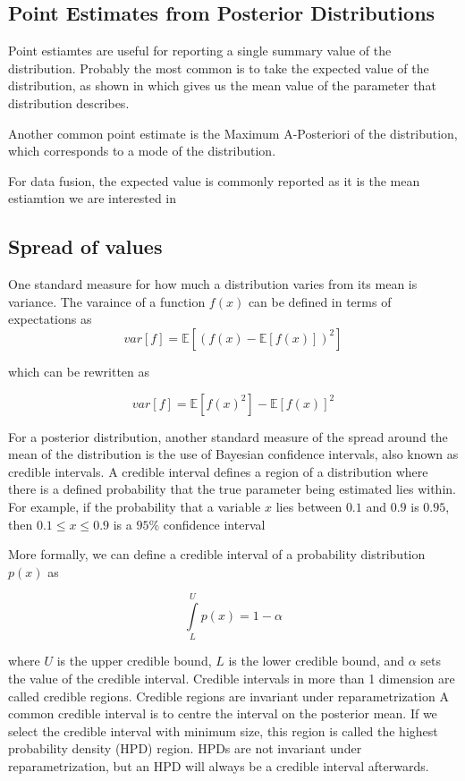 %	

\subsection{Point Estimates from Posterior Distributions}

Point estiamtes are useful for reporting a single summary value of the distribution. 
Probably the most common is to take the expected value of the distribution, as shown in  which gives us the mean value of the parameter that distribution describes. 

Another common point estimate is the Maximum A-Posteriori of the distribution, which corresponds to a mode of the distribution.

For data fusion, the expected value is commonly reported as it is the mean estiamtion we are interested in 


\subsection{Spread of values}
One standard measure for how much a distribution varies from its mean is variance. The varaince of a function $f(x)$ can be defined in terms of expectations as 
\[ 
var[f]=\mathbb{E}[(f(x)-\mathbb{E}[f(x)])^2]
\]

which can be rewritten as

\[ 
var[f]=\mathbb{E}[f(x)^2]-\mathbb{E}[f(x)]^2
\]


For a posterior distribution, another standard measure of the spread around the mean of the distribution is the use of Bayesian confidence intervals, also known as credible intervals. 
A credible interval defines a region of a distribution where there is a defined probability that the true parameter being estimated lies within. 
For example, if the probability that a variable $x$ lies between $0.1$ and $0.9$ is $0.95$, then $0.1 \leq  x \leq 0.9$ is a $95\% $ confidence interval

More formally, we can define a credible interval of a probability distribution $p(x)$ as

\[ 
\int\limits_L^U p(x)=1-\alpha
\]

where $U$ is the upper credible bound, $L$ is the lower credible bound, and $\alpha$ sets the value of the credible interval. 
Credible intervals in more than 1 dimension are called credible regions. 
Credible regions are invariant under reparametrization A common credible interval is to centre the interval on the posterior mean. 
If we select the credible interval with minimum size, this region is called the highest probability density (HPD) region. 
HPDs are not invariant under reparametrization, but an HPD will always be a credible interval afterwards. 

